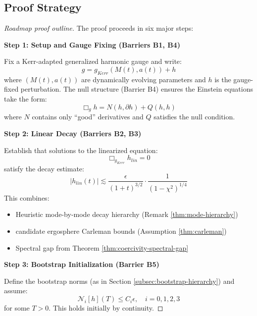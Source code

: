 \documentclass[12pt,a4paper]{article}
\begin{document}
\subsection{Proof Strategy}

\begin{proof}[Roadmap proof outline]
The proof proceeds in six major steps:

\textbf{Step 1: Setup and Gauge Fixing (Barriers B1, B4)}

Fix a Kerr-adapted generalized harmonic gauge and write:
\begin{equation}
g = g_{Kerr}(M(t), a(t)) + h
\end{equation}
where $(M(t), a(t))$ are dynamically evolving parameters and $h$ is the gauge-fixed perturbation. The null structure (Barrier B4) ensures the Einstein equations take the form:
\begin{equation}
\Box_g h = N(h, \partial h) + Q(h, h)
\end{equation}
where $N$ contains only ``good'' derivatives and $Q$ satisfies the null condition.

\textbf{Step 2: Linear Decay (Barriers B2, B3)}

Establish that solutions to the linearized equation:
\begin{equation}
\Box_{g_{Kerr}} h_{lin} = 0
\end{equation}
satisfy the decay estimate:
\begin{equation}
|h_{lin}(t)| \lesssim \frac{\epsilon}{(1 + t)^{3/2}} \cdot \frac{1}{(1-\chi^2)^{1/4}}
\end{equation}
This combines:
\begin{itemize}
    \item Heuristic mode-by-mode decay hierarchy (Remark \ref{thm:mode-hierarchy})
    \item candidate ergosphere Carleman bounds (Assumption \ref{thm:carleman})
    \item Spectral gap from Theorem \ref{thm:coercivity-spectral-gap}
\end{itemize}

\textbf{Step 3: Bootstrap Initialization (Barrier B5)}

Define the bootstrap norms (as in Section \ref{subsec:bootstrap-hierarchy}) and assume:
\begin{equation}
\mathcal{N}_i[h](T) \leq C_i \epsilon, \quad i = 0, 1, 2, 3
\end{equation}
for some $T > 0$. This holds initially by continuity.


\end{proof}
\end{document}
